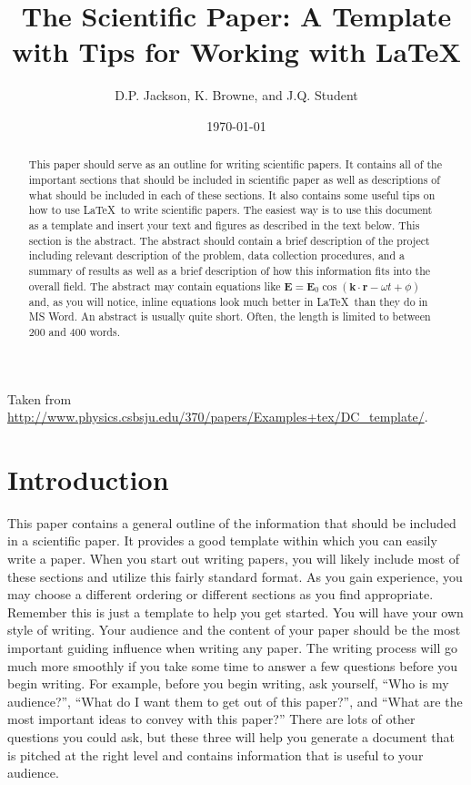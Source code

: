 \documentclass[preprint,pre,floats,aps,amsmath,amssymb]{revtex4}
\begin{document}
Taken from \url{http://www.physics.csbsju.edu/370/papers/Examples+tex/DC_template/}.
\title{The Scientific Paper: A Template with Tips for Working with \LaTeX}
\author{D.P. Jackson, K. Browne, and J.Q. Student}  \date{\today}

\begin{abstract}
This paper should serve as an outline for writing scientific papers. It contains all of the important sections that should be included in scientific paper as well as descriptions of what should be included in each of these sections. It also contains some useful tips on how to use \LaTeX\ to write scientific papers. The easiest way is to use this document as a template and insert your text and figures as described in the text below. This section is the abstract. The abstract should contain a brief description of the project including relevant description of the problem, data collection procedures, and a summary of results as well as a brief description of how this information fits into the overall field. The abstract may contain equations like $\textbf{E}=\textbf{E}_0\cos (\textbf{k}\cdot\textbf{r}-\omega t+\phi)$ and, as you will notice, inline equations look much better in \LaTeX\ than they do in MS Word. An abstract is usually quite short. Often, the length is limited to between 200 and 400 words.
\end{abstract}

\maketitle

\section{Introduction}
\label{sec:intro}

This paper contains a general outline of the information that should be included in a scientific paper. It provides a good template within which you can easily write a paper. When you start out writing papers, you will likely include most of these sections and utilize this fairly standard format. As you gain experience, you may choose a different ordering or different sections as you find appropriate. Remember this is just a template to help you get started. You will have your own style of writing. Your audience and the content of your paper should be the most important guiding influence when writing any paper. The writing process will go much more smoothly if you take some time to answer a few questions before you begin writing. For example, before you begin writing, ask yourself, ``Who is my audience?'', ``What do I want them to get out of this paper?'', and ``What are the most important ideas to convey with this paper?'' There are lots of other questions you could ask, but these three will help you generate a document that is pitched at the right level and contains information that is useful to your audience.
\end{document}
